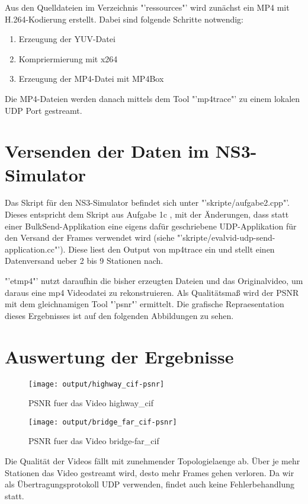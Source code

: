 \documentclass[12pt,a4paper,titlepage]{article}
\begin{document}
Aus den Quelldateien im Verzeichnis "'ressources"' wird zunächst ein MP4 mit H.264-Kodierung erstellt. Dabei sind folgende Schritte notwendig:
\begin{enumerate}
\item Erzeugung der YUV-Datei
\item Kompriermierung mit x264
\item Erzeugung der MP4-Datei mit MP4Box
\end{enumerate}
Die MP4-Dateien werden danach mittels dem Tool "'mp4trace"' zu einem lokalen UDP Port gestreamt.


\section{Versenden der Daten im NS3-Simulator}

Das Skript für den NS3-Simulator befindet sich unter "'skripte/aufgabe2.cpp"'. Dieses entspricht dem Skript aus Aufgabe 1c , mit der Änderungen, dass statt einer BulkSend-Applikation eine eigens dafür geschriebene UDP-Applikation für den Versand der Frames verwendet wird (siehe "'skripte/evalvid-udp-send-application.cc"'). Diese liest den Output von mp4trace ein und stellt einen Datenversand ueber 2 bis 9 Stationen nach.

"'etmp4"' nutzt daraufhin die bisher erzeugten Dateien und das Originalvideo, um daraus eine mp4 Videodatei zu rekonstruieren. Als Qualitätsmaß wird der PSNR mit dem gleichnamigen Tool "'psnr"' ermittelt. Die grafische Repraesentation dieses Ergebnisses ist auf den folgenden Abbildungen zu sehen.

\section{Auswertung der Ergebnisse}

\begin{figure}[h]
	\centering
% 	
	\texttt{[image: output/highway\_cif-psnr]}
	\caption{PSNR fuer das Video highway\_cif}
	\label{fig:Durchsatz}
\end{figure}

\begin{figure}[h]
 	\centering
% 	
 	\texttt{[image: output/bridge\_far\_cif-psnr]}
 	\caption{PSNR fuer das Video bridge-far\_cif}
 	\label{fig:Durchsatz2}
\end{figure}

Die Qualität der Videos fällt mit zunehmender Topologielaenge ab. Über je mehr Stationen das Video gestreamt wird, desto mehr Frames gehen verloren. Da wir als Übertragungsprotokoll UDP verwenden, findet auch keine Fehlerbehandlung statt.
\end{document}
